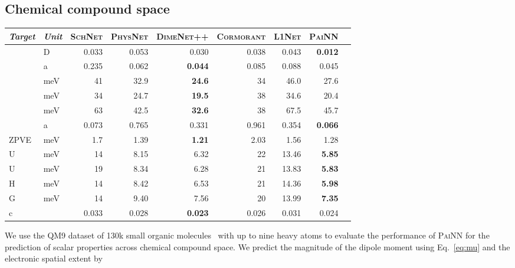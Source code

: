 \documentclass[reprint,
amsmath,amssymb,
 aip,jcp
]{revtex4-2}
\newcommand{\painn}{\textsc{PaiNN}}
\begin{document}
\subsection{Chemical compound space}
\begin{table*}[tb]
\caption{Mean absolute errors on QM9 dataset for various chemical properties. Results for \painn{} are averaged over three random splits. Best in \textbf{bold}.}
\label{tab:qm9}
\begin{center}
\begin{small}
\begin{tabular}{llrrrrrrr}
\toprule
\textit{Target} & \textit{Unit} & \textsc{\textbf{SchNet}} & \textsc{\textbf{PhysNet}} & \textsc{\textbf{DimeNet++}} & \textsc{\textbf{Cormorant}} & \textsc{\textbf{L1Net}} & \textsc{\textbf{\painn{}}} \\ \midrule
 & D & 0.033 & 0.053 & 0.030 & 0.038 & 0.043 & \textbf{0.012}\\
 & a &  0.235  & 0.062 & \textbf{0.044}  & 0.085 & 0.088 & 0.045 \\
 & meV & 41 & 32.9 & \textbf{24.6}  & 34 & 46.0 & 27.6 \\
 & meV & 34 & 24.7 & \textbf{19.5}  & 38 & 34.6 & 20.4 \\
 & meV & 63 & 42.5 & \textbf{32.6} & 38 & 67.5 &  45.7 \\
 & a & 0.073 & 0.765 & 0.331 & 0.961 & 0.354 & \textbf{0.066} \\
ZPVE & meV & 1.7 & 1.39 & \textbf{1.21} & 2.03 & 1.56 & 1.28 \\
U & meV & 14 & 8.15 & 6.32 & 22 & 13.46  & \textbf{5.85} \\
U & meV & 19 & 8.34 & 6.28 & 21 & 13.83  & \textbf{5.83} \\
H & meV & 14 & 8.42 & 6.53 & 21 & 14.36  & \textbf{5.98} \\
G & meV & 14 & 9.40 & 7.56 & 20 & 13.99  & \textbf{7.35} \\
c &  & 0.033 & 0.028 & \textbf{0.023} & 0.026 & 0.031 & 0.024 \\
\bottomrule
\end{tabular}
\end{small}
\end{center}
\vskip -0.1in
\end{table*}

We use the QM9 dataset of 130k small organic molecules~\cite{ramakrishnan2014quantum} with up to nine heavy atoms to evaluate the performance of \painn{} for the prediction of scalar properties across chemical compound space.
We predict the magnitude of the dipole moment using Eq.~\ref{eq:mu} and the electronic spatial extent by
\end{document}
